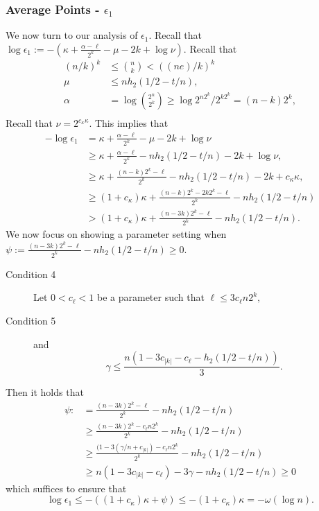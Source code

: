 \subsubsection{Average Points - $\epsilon_1$} 
We now turn to our analysis of $\epsilon_1$.  Recall that $\log{\epsilon_1}:= -\left(\kappa+\frac{\alpha -\ell}{2^k} - \mu -2k+\log{\nu}\right).$
Recall that 
\begin{align*}
(n/k)^k &\le {n\choose k} < ((ne)/k)^k\\
\mu&\le nh_2(1/2-t/n),\\
\alpha &= \log{2^n\choose 2^k} \ge \log{2^{n2^k} /2^{k2^k}} = (n-k)2^k,\\
\end{align*}
Recall that $\nu = 2^{c_\kappa \kappa}$.
This implies that 
\begin{align*}
-\log{\epsilon_1}&= \kappa+\frac{\alpha-\ell}{2^k} - \mu -2k+\log{\nu}\\
&\ge  \kappa+\frac{\alpha -\ell}{2^k} - nh_2(1/2-t/n) - 2k+\log{\nu},\\
&\ge  \kappa+\frac{(n-k)2^k-\ell}{2^k} - nh_2(1/2-t/n) - 2k+c_{\kappa}\kappa,\\
&\ge  (1+c_{\kappa})\kappa+\frac{(n-k)2^k-2k2^{k}-\ell}{2^k} - nh_2(1/2-t/n)\\
&>  (1+c_{\kappa})\kappa+\frac{(n-3k)2^k-\ell}{2^k} - nh_2(1/2-t/n) .
\end{align*}
\noindent
We now focus on showing a parameter setting when $\psi:=\frac{(n-3k)2^k-\ell}{2^k} - nh_2(1/2-t/n)\ge 0$.
\begin{description}
\item[Condition 4]
Let $0< c_\ell<1$ be a parameter such that 
$
\ell\le 3c_{\ell} n2^k,$
\item[Condition 5] 
and 
\[
\gamma \le \frac{n(1-3c_{|k|} -c_{\ell}- h_2(1/2-t/n))}{3}.
\]
\end{description}
\noindent
Then it holds that 
\begin{align*}
\psi:&=\frac{(n-3k)2^k-\ell}{2^k} - nh_2(1/2-t/n) \\
&\ge   \frac{(n-3k)2^k-c_{\ell}n2^k}{2^k} - nh_2(1/2-t/n)\\
&\ge   \frac{(1-3(\gamma/n+c_{|k|}) -c_{\ell}n2^k}{2^k} - nh_2(1/2-t/n)\\
&\ge n(1-3c_{|k|}-c_{\ell}) - 3\gamma - nh_2(1/2-t/n) \ge 0
\end{align*}
which suffices to ensure that 
\[
\log{\epsilon_1} \le  -\left((1+c_{\kappa})\kappa+\psi \right) \le  -(1+c_{\kappa})\kappa = -\omega(\log{n}).
\]
